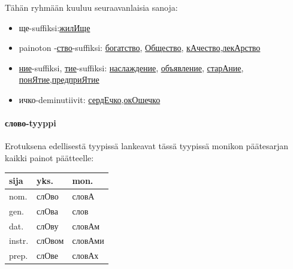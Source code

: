 \documentclass[]{scrartcl}
\providecommand{\tightlist}{%
  \setlength{\itemsep}{0pt}\setlength{\parskip}{0pt}}
\begin{document}
Tähän ryhmään kuuluu seuraavanlaisia sanoja:

\begin{itemize}
\tightlist
\item
  ще-suffiksi:\href{http://ru.wiktionary.org/wiki/\%D0\%B6\%D0\%B8\%D0\%BB\%D0\%B8\%D1\%89\%D0\%B5}{жилИще}
\item
  painoton
  -\href{http://ru.wiktionary.org/wiki/\%D1\%81\%D1\%82\%D0\%B2\%D0\%BE}{ство}-suffiksi:
  \href{http://ru.wiktionary.org/wiki/\%D0\%B1\%D0\%BE\%D0\%B3\%D0\%B0\%D1\%82\%D1\%81\%D1\%82\%D0\%B2\%D0\%BE}{богатство},
  \href{http://ru.wiktionary.org/wiki/\%D0\%BE\%D0\%B1\%D1\%89\%D0\%B5\%D1\%81\%D1\%82\%D0\%B2\%D0\%BE}{Общество},
  \href{http://ru.wiktionary.org/wiki/\%D0\%BA\%D0\%B0\%D1\%87\%D0\%B5\%D1\%81\%D1\%82\%D0\%B2\%D0\%BE}{кАчество},\href{http://ru.wiktionary.org/wiki/\%D0\%BB\%D0\%B5\%D0\%BA\%D0\%B0\%D1\%80\%D1\%81\%D1\%82\%D0\%B2\%D0\%BE}{лекАрство}
\item
  \href{http://ru.wiktionary.org/wiki/\%D0\%BD\%D0\%B8\%D0\%B5}{ние}-suffiksi,
  \href{http://ru.wiktionary.org/wiki/\%D1\%82\%D0\%B8\%D0\%B5}{тие}-suffiksi:
  \href{http://ru.wiktionary.org/wiki/\%D0\%BD\%D0\%B0\%D1\%81\%D0\%BB\%D0\%B0\%D0\%B6\%D0\%B4\%D0\%B5\%D0\%BD\%D0\%B8\%D0\%B5}{наслаждение},
  \href{http://ru.wiktionary.org/wiki/\%D0\%BE\%D0\%B1\%D1\%8A\%D1\%8F\%D0\%B2\%D0\%BB\%D0\%B5\%D0\%BD\%D0\%B8\%D0\%B5}{объявление},
  \href{http://ru.wiktionary.org/wiki/\%D1\%81\%D1\%82\%D0\%B0\%D1\%80\%D0\%B0\%D0\%BD\%D0\%B8\%D0\%B5}{старАние},
  \href{http://ru.wiktionary.org/wiki/\%D0\%BF\%D0\%BE\%D0\%BD\%D1\%8F\%D1\%82\%D0\%B8\%D0\%B5}{понЯтие},\href{http://ru.wiktionary.org/wiki/\%D0\%BF\%D1\%80\%D0\%B5\%D0\%B4\%D0\%BF\%D1\%80\%D0\%B8\%D1\%8F\%D1\%82\%D0\%B8\%D0\%B5}{предприЯтие}
\item
  ичко-deminutiivit:
  \href{http://ru.wiktionary.org/wiki/\%D1\%81\%D0\%B5\%D1\%80\%D0\%B4\%D0\%B5\%D1\%87\%D0\%BA\%D0\%BE}{сердЕчко},\href{http://ru.wiktionary.org/wiki/\%D0\%BE\%D0\%BA\%D0\%BE\%D1\%88\%D0\%B5\%D1\%87\%D0\%BA\%D0\%BE}{окОшечко}
\end{itemize}

\paragraph{слово-tyyppi}\label{ux441ux43bux43eux432ux43e-tyyppi}

Erotuksena edellisestä tyypissä lankeavat tässä tyypissä monikon
päätesarjan kaikki painot päätteelle:

\begin{longtable}[c]{@{}lll@{}}
\toprule
sija & yks. & mon.\tabularnewline
\midrule
\endhead
nom. & слОво & словА\tabularnewline
gen. & слОва & слов\tabularnewline
dat. & слОву & словАм\tabularnewline
instr. & слОвом & словАми\tabularnewline
prep. & слОве & словАх\tabularnewline
\bottomrule
\end{longtable}
\end{document}
